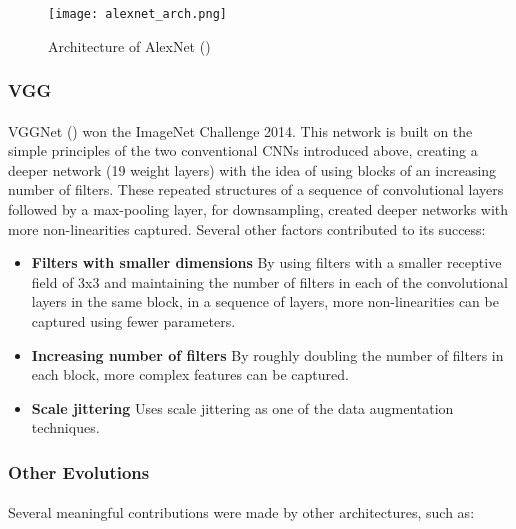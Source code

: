     \begin{figure}[hbt!]
        \centering
        \texttt{[image: alexnet\_arch.png]}
        \caption{Architecture of AlexNet (\cite{10.5555/2999134.2999257})}
        \label{fig_alexnet}
    \end{figure}


\subsubsection{VGG}
\paragraph{}
VGGNet (\cite{simonyan2014deep}) won the ImageNet Challenge 2014. This network is built on the simple principles of the two conventional \gls{CNN}s introduced above, creating a deeper network (19 weight layers) with the idea of using blocks of an increasing number of filters. These repeated structures of a sequence of convolutional layers followed by a max-pooling layer, for downsampling, created deeper networks with more non-linearities captured. Several other factors contributed to its success:

\begin{itemize}
    \item \textbf{Filters with smaller dimensions} By using filters with a smaller receptive field of 3x3 and maintaining the number of filters in each of the convolutional layers in the same block, in a sequence of layers, more non-linearities can be captured using fewer parameters.
 
    \item \textbf{Increasing number of filters} By roughly doubling the number of filters in each block, more complex features can be captured.
    \item \textbf{Scale jittering} Uses scale jittering as one of the data augmentation techniques.

\end{itemize}

\subsubsection{Other Evolutions}
\paragraph{}
Several meaningful contributions were made by other architectures, such as:

